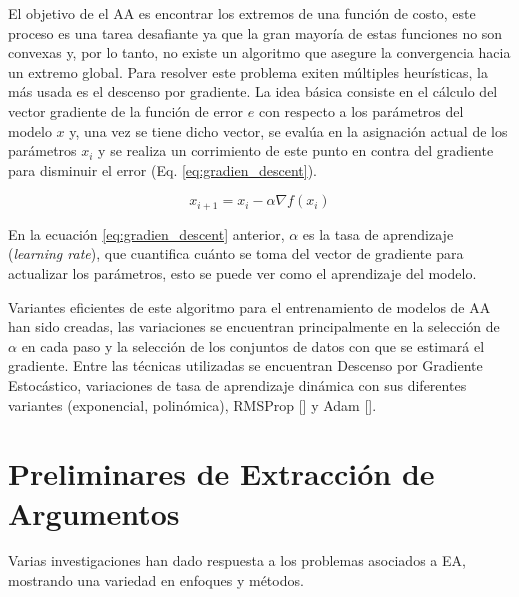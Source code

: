 El objetivo de el AA es encontrar los extremos de una función de costo, este proceso es una tarea 
desafiante ya que la gran mayoría de estas funciones no son convexas y, por lo tanto, no existe un algoritmo
que asegure la convergencia hacia un extremo global. Para resolver este problema exiten múltiples heurísticas,
la más usada es el descenso por gradiente. La idea básica consiste 
en el cálculo del vector gradiente de la función de error $e$ con respecto a los parámetros del modelo $x$ y, una vez se 
tiene dicho vector, se evalúa en la asignación actual de los parámetros $x_i$ y se realiza un corrimiento de este punto 
en contra del gradiente para disminuir el error (Eq. \ref{eq:gradien_descent}).

\begin{equation}
	x_{i+1} = x_i - \alpha \nabla f(x_i)\label{eq:gradien_descent}
\end{equation}

En la ecuación \ref{eq:gradien_descent} anterior, $\alpha$ es la tasa de aprendizaje (\emph{learning rate}),
que cuantifica cuánto se toma del vector de gradiente para actualizar los parámetros, esto 
se puede ver como el aprendizaje del modelo.

Variantes eficientes de este algoritmo para el entrenamiento de modelos de AA han sido 
creadas, las variaciones se encuentran principalmente en la selección de $\alpha$ en cada paso y la 
selección de los conjuntos de datos con que se estimará el gradiente. Entre las técnicas utilizadas se 
encuentran Descenso por Gradiente Estocástico, variaciones de tasa de aprendizaje dinámica con 
sus diferentes variantes (exponencial, polinómica), RMSProp [\cite{tieleman2012rmsp}] 
y Adam [\cite{kingma2014adam}].

\section{Preliminares de Extracción de Argumentos}

Varias investigaciones han dado respuesta a los problemas asociados a EA, mostrando
una variedad en enfoques y métodos.


